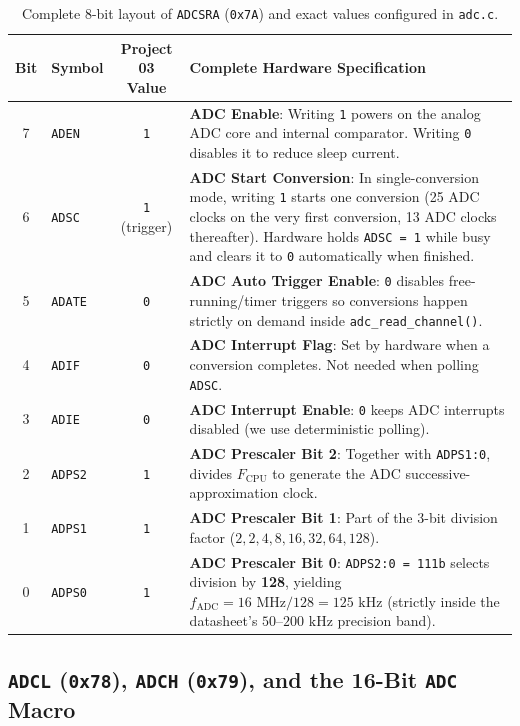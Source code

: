 \documentclass[11pt,a4paper,oneside]{report}
\begin{document}
\begin{table}[!htbp]
\centering
\caption{Complete 8-bit layout of \texttt{ADCSRA} (\texttt{0x7A}) and exact values configured in \texttt{adc.c}.}
\label{tab:ch3_adcsra}
\begin{tabularx}{\linewidth}{c l c X}
\toprule
\textbf{Bit} & \textbf{Symbol} & \textbf{Project 03 Value} & \textbf{Complete Hardware Specification} \\
\midrule
7 & \texttt{ADEN} & \texttt{1} & \textbf{ADC Enable}: Writing \texttt{1} powers on the analog ADC core and internal comparator. Writing \texttt{0} disables it to reduce sleep current. \\
6 & \texttt{ADSC} & \texttt{1} (trigger) & \textbf{ADC Start Conversion}: In single-conversion mode, writing \texttt{1} starts one conversion (25 ADC clocks on the very first conversion, 13 ADC clocks thereafter). Hardware holds \texttt{ADSC = 1} while busy and clears it to \texttt{0} automatically when finished. \\
5 & \texttt{ADATE} & \texttt{0} & \textbf{ADC Auto Trigger Enable}: \texttt{0} disables free-running/timer triggers so conversions happen strictly on demand inside \texttt{adc\_read\_channel()}. \\
4 & \texttt{ADIF} & \texttt{0} & \textbf{ADC Interrupt Flag}: Set by hardware when a conversion completes. Not needed when polling \texttt{ADSC}. \\
3 & \texttt{ADIE} & \texttt{0} & \textbf{ADC Interrupt Enable}: \texttt{0} keeps ADC interrupts disabled (we use deterministic polling). \\
2 & \texttt{ADPS2} & \texttt{1} & \textbf{ADC Prescaler Bit 2}: Together with \texttt{ADPS1:0}, divides $F_{\text{CPU}}$ to generate the ADC successive-approximation clock. \\
1 & \texttt{ADPS1} & \texttt{1} & \textbf{ADC Prescaler Bit 1}: Part of the 3-bit division factor ($2, 2, 4, 8, 16, 32, 64, 128$). \\
0 & \texttt{ADPS0} & \texttt{1} & \textbf{ADC Prescaler Bit 0}: \texttt{ADPS2:0 = 111b} selects division by \textbf{128}, yielding $f_{\text{ADC}} = 16\text{ MHz} / 128 = 125\text{ kHz}$ (strictly inside the datasheet's $50\text{--}200\text{ kHz}$ precision band). \\
\bottomrule
\end{tabularx}
\end{table}

\subsection{\texttt{ADCL} (\texttt{0x78}), \texttt{ADCH} (\texttt{0x79}), and the 16-Bit \texttt{ADC} Macro}
\end{document}
